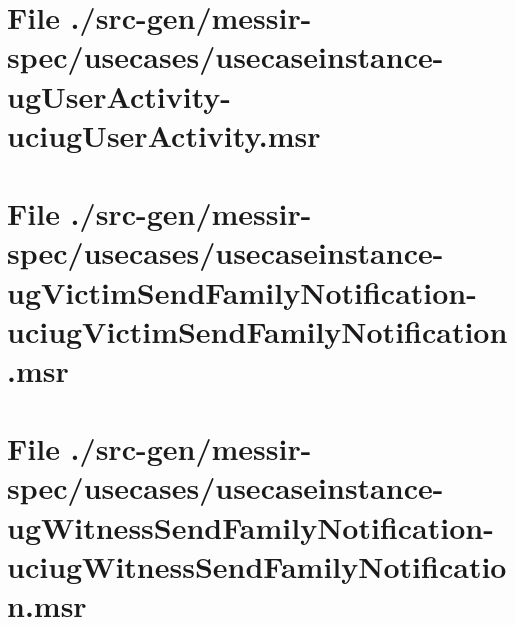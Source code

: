 \section[File /src-gen.../usecaseinstance-ugUserActivity-uciugUserActivity.msr]{File ./src-gen/messir-spec/usecases/usecaseinstance-ugUserActivity-uciugUserActivity.msr}
\scriptsize

\normalsize
	
\section[File /.../usecaseinstance-ugVictimSendFamilyNotification-uciugVictimSendFamilyNotification.msr]{File ./src-gen/messir-spec/usecases/usecaseinstance-ugVictimSendFamilyNotification-uciugVictimSendFamilyNotification.msr}
\scriptsize

\normalsize
	
\section[File /.../usecaseinstance-ugWitnessSendFamilyNotification-uciugWitnessSendFamilyNotification.msr]{File ./src-gen/messir-spec/usecases/usecaseinstance-ugWitnessSendFamilyNotification-uciugWitnessSendFamilyNotification.msr}
\scriptsize

\normalsize
	
